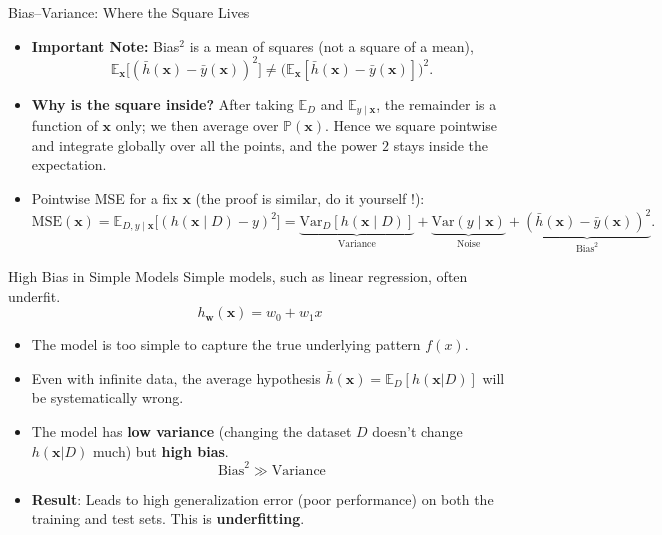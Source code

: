 \documentclass[serif, aspectratio=169]{beamer}
\begin{document}
\begin{frame}{Bias--Variance: Where the Square Lives}
\begin{itemize}
  \item \textbf{Important Note:} Bias$^2$ is a mean of squares (not a square of a mean),
  \[
    \mathbb{E}_{\mathbf{x}} \big[(\bar h(\mathbf{x})-\bar y(\mathbf{x}))^2\big]
    \neq
    \big(\mathbb{E}_{\mathbf{x}}[\bar h(\mathbf{x})-\bar y(\mathbf{x})]\big)^2.
  \]

  \item \textbf{Why is the square inside?}
  After taking $\mathbb{E}_D$ and $\mathbb{E}_{y\mid \mathbf{x}}$, the remainder is a function of $\mathbf{x}$ only; we then average over $\mathbb{P}(\mathbf{x})$. Hence we square pointwise and integrate globally over all the points, and the power $2$ stays inside the expectation.

  \item Pointwise MSE for a fix $\mathbf{x}$ (the proof is similar, do it yourself !):
  \[
    \mathrm{MSE}(\mathbf{x})
    = \mathbb{E}_{D, y\mid \mathbf{x}} \big[(h(\mathbf{x}\mid D)-y)^2\big]
    = \underbrace{\mathrm{Var}_{D}[h(\mathbf{x}\mid D)]}_{\text{Variance}}
    + \underbrace{\mathrm{Var}(y\mid \mathbf{x})}_{\text{Noise}} + \underbrace{(\bar h(\mathbf{x})-\bar y(\mathbf{x}))^2}_{\text{Bias}^2}.
  \]
\end{itemize}
\end{frame}



\begin{frame}{High Bias in Simple Models}
    Simple models, such as linear regression, often underfit.
    \[
    h_{\mathbf{w}}(\mathbf{x}) = w_0 + w_1 x
    \]
    \begin{itemize}
        \item The model is too simple to capture the true underlying pattern $f(x)$.
        \item Even with infinite data, the average hypothesis $\bar{h}(\mathbf{x}) = \mathbb{E}_D[h(\mathbf{x} \vert D)]$ will be systematically wrong.
        \item The model has \textbf{low variance} (changing the dataset $D$ doesn't change $h(\mathbf{x} \vert D)$ much) but \textbf{high bias}.
        \[
        \text{Bias}^2 \gg \text{Variance}
        \]
        \item \textbf{Result}: Leads to high generalization error (poor performance) on both the training and test sets. This is \textbf{underfitting}.
    \end{itemize}
\end{frame}
\end{document}
